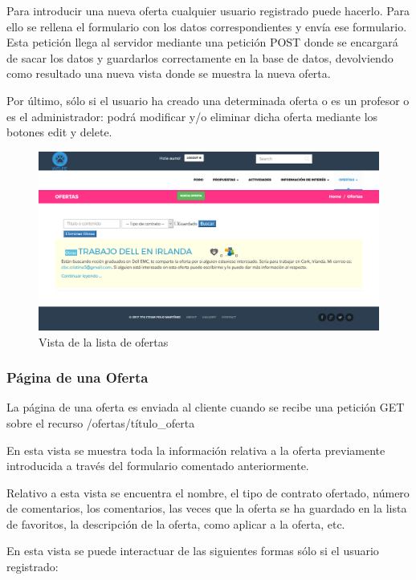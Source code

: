 Para introducir una nueva oferta cualquier usuario registrado puede hacerlo. Para ello se rellena el formulario con los datos correspondientes y envía ese formulario. Esta petición llega al servidor mediante una petición POST donde se encargará de sacar los datos y guardarlos correctamente en la base de datos, devolviendo como resultado una nueva vista donde se muestra la nueva oferta.


Por último, sólo si el usuario ha creado una determinada oferta o es un profesor o es el administrador: podrá modificar y/o eliminar dicha oferta mediante los botones edit y delete.


\begin{figure}[H]
   \centering
   \includegraphics[width=12cm]{img/ofertas}
   \caption{Vista de la lista de ofertas}
   \label{figura:ofertas}
\end{figure}


\subsubsection{Página de una Oferta}
\label{subsubsec:oferta}


La página de una oferta es enviada al cliente cuando se recibe una petición GET sobre el recurso /ofertas/{título\_oferta}


En esta vista se muestra toda la información relativa a la oferta previamente introducida a través del formulario comentado anteriormente. 


Relativo a esta vista se encuentra el nombre, el tipo de contrato ofertado, número de comentarios, los comentarios, las veces que la oferta se ha guardado en la lista de favoritos, la descripción de la oferta, como aplicar a la oferta, etc.


En esta vista se puede interactuar de las siguientes formas sólo si el usuario registrado:


